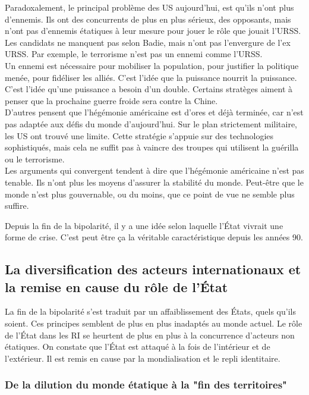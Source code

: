 \documentclass[10pt, a4paper, openany]{book}
\begin{document}
Paradoxalement, le principal problème des US aujourd'hui, est qu'ils n'ont plus d'ennemis. Ils ont des concurrents de plus en plus sérieux, des opposants, mais n'ont pas d'ennemis étatiques à leur mesure pour jouer le rôle que jouait l'URSS. \\
Les candidats ne manquent pas selon Badie, mais n'ont pas l'envergure de l'ex URSS. Par exemple, le terrorisme n'est pas un ennemi comme l'URSS. \\
Un ennemi est nécessaire pour mobiliser la population, pour justifier la politique menée, pour fidéliser les alliés. C'est l'idée que la puissance nourrit la puissance. C'est l'idée qu'une puissance a besoin d'un double. Certains stratèges aiment à penser que la prochaine guerre froide sera contre la Chine. \\
D'autres pensent que l'hégémonie américaine est d'ores et déjà terminée, car n'est pas adaptée aux défis du monde d'aujourd'hui. Sur le plan strictement militaire, les US ont trouvé une limite. Cette stratégie s'appuie sur des technologies sophistiqués, mais cela ne suffit pas à vaincre des troupes qui utilisent la guérilla ou le terrorisme. \\
Les arguments qui convergent tendent à dire que l'hégémonie américaine n'est pas tenable. Ils n'ont plus les moyens d'assurer la stabilité du monde. Peut-être que le monde n'est plus gouvernable, ou du moins, que ce point de vue ne semble plus suffire.


Depuis la fin de la bipolarité, il y a une idée selon laquelle l'État vivrait une forme de crise. C'est peut être ça la véritable caractéristique depuis les années 90. 

\subsection{La diversification des acteurs internationaux et la remise en cause du rôle de l'État}

La fin de la bipolarité s'est traduit par un affaiblissement des États, quels qu'ils soient. Ces principes semblent de plus en plus inadaptés au monde actuel. Le rôle de l'État dans les RI se heurtent de plus en plus à la concurrence d'acteurs non étatiques. On constate que l'État est attaqué à la fois de l'intérieur et de l'extérieur. Il est remis en cause par la mondialisation et le repli identitaire.

\subsubsection{De la dilution du monde étatique à la "fin des territoires"}
\end{document}
